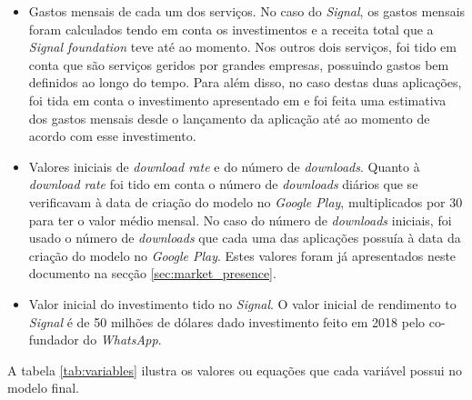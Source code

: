 \begin{itemize}
   \item Gastos mensais de cada um dos serviços. No caso do \textit{Signal}, os gastos mensais foram calculados tendo em conta os investimentos e a receita total que a \textit{Signal foundation} teve até ao momento. Nos outros dois serviços, foi tido em conta que são serviços geridos por grandes empresas, possuindo gastos bem definidos ao longo do tempo. Para além disso, no caso destas duas aplicações, foi tida em conta o investimento apresentado em \cite{whatsapp_craft} e foi feita uma estimativa dos gastos mensais desde o lançamento da aplicação até ao momento de acordo com esse investimento.
   
   \item Valores iniciais de \textit{download rate} e do número de \textit{downloads}. Quanto à \textit{download rate} foi tido em conta o número de \textit{downloads} diários que se verificavam à data de criação do modelo no \textit{Google Play}, multiplicados por 30 para ter o valor médio mensal. No caso do número de \textit{downloads} iniciais, foi usado o número de \textit{downloads} que cada uma das aplicações possuía à data da criação do modelo no \textit{Google Play}. Estes valores foram já apresentados neste documento na secção \ref{sec:market_presence}.
   
   \item Valor inicial do investimento tido no \textit{Signal}. O valor inicial de rendimento to \textit{Signal} é de 50 milhões de dólares dado investimento feito em 2018 pelo co-fundador do \textit{WhatsApp}.
\end{itemize}

A tabela \ref{tab:variables} ilustra os valores ou equações que cada variável possui no modelo final.

